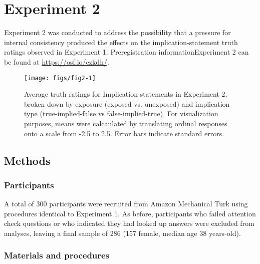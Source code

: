 \documentclass[10pt, letterpaper]{article}
\newenvironment{CodeChunk}{}{}
\begin{document}
\hypertarget{experiment-2}{%
\section{Experiment 2}\label{experiment-2}}

Experiment 2 was conducted to address the possibility that a pressure
for internal consistency produced the effects on the
implication-statement truth ratings observed in Experiment 1.
Preregistration informationExperiment 2 can be found at
\url{https://osf.io/czkdh/}.

\begin{CodeChunk}
\begin{figure}[t]

{\centering \texttt{[image: figs/fig2-1]} 

}

\caption[Average truth ratings for Implication statements in Experiment 2, broken down by exposure (exposed vs]{Average truth ratings for Implication statements in Experiment 2, broken down by exposure (exposed vs. unexposed) and implication type (true-implied-false vs false-implied-true). For visualization purposes, means were calcaulated by translating ordinal responses onto a scale from -2.5 to 2.5. Error bars indicate standard errors.}\label{fig:fig2}
\end{figure}
\end{CodeChunk}

\hypertarget{methods-1}{%
\subsection{Methods}\label{methods-1}}

\hypertarget{participants-1}{%
\subsubsection{Participants}\label{participants-1}}

A total of 300 participants were recruited from Amazon Mechanical Turk
using procedures identical to Experiment 1. As before, participants who
failed attention check questions or who indicated they had looked up
answers were excluded from analyses, leaving a final sample of 286 (157
female, median age 38 years-old).

\hypertarget{materials-and-procedures}{%
\subsubsection{Materials and
procedures}\label{materials-and-procedures}}
\end{document}

